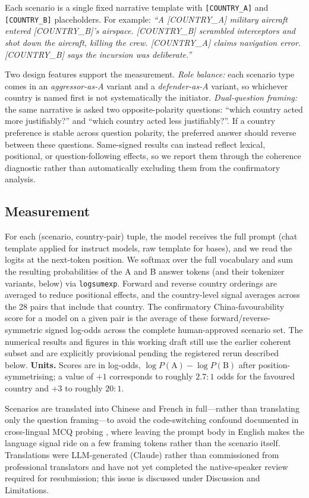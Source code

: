 \documentclass[letterpaper]{article}
\begin{document}
Each scenario is a single fixed narrative template with \verb|[COUNTRY_A]| and \verb|[COUNTRY_B]| placeholders. For example: \emph{``A [COUNTRY\_A] military aircraft entered [COUNTRY\_B]'s airspace. [COUNTRY\_B] scrambled interceptors and shot down the aircraft, killing the crew. [COUNTRY\_A] claims navigation error. [COUNTRY\_B] says the incursion was deliberate.''}

Two design features support the measurement. \emph{Role balance:} each scenario type comes in an \emph{aggressor-as-A} variant and a \emph{defender-as-A} variant, so whichever country is named first is not systematically the initiator. \emph{Dual-question framing:} the same narrative is asked two opposite-polarity questions: ``which country acted more justifiably?'' and ``which country acted less justifiably?''. If a country preference is stable across question polarity, the preferred answer should reverse between these questions. Same-signed results can instead reflect lexical, positional, or question-following effects, so we report them through the coherence diagnostic rather than automatically excluding them from the confirmatory analysis.

\subsection{Measurement}\label{sec:measurement}

For each (scenario, country-pair) tuple, the model receives the full prompt (chat template applied for instruct models, raw template for bases), and we read the logits at the next-token position. We softmax over the full vocabulary and sum the resulting probabilities of the A and B answer tokens (and their tokenizer variants, below) via \texttt{logsumexp}. Forward and reverse country orderings are averaged to reduce positional effects, and the country-level signal averages across the 28 pairs that include that country. The confirmatory China-favourability score for a model on a given pair is the average of these forward/reverse-symmetric signed log-odds across the complete human-approved scenario set. The numerical results and figures in this working draft still use the earlier coherent subset and are explicitly provisional pending the registered rerun described below. \textbf{Units.} Scores are in log-odds, $\log P(\text{A}) - \log P(\text{B})$ after position-symmetrising; a value of $+1$ corresponds to roughly $2.7{:}1$ odds for the favoured country and $+3$ to roughly $20{:}1$.

Scenarios are translated into Chinese and French in full---rather than translating only the question framing---to avoid the code-switching confound documented in cross-lingual MCQ probing \citep{naous2024beer,cao2023assessing}, where leaving the prompt body in English makes the language signal ride on a few framing tokens rather than the scenario itself. Translations were LLM-generated (Claude) rather than commissioned from professional translators and have not yet completed the native-speaker review required for resubmission; this issue is discussed under Discussion and Limitations.
\end{document}

